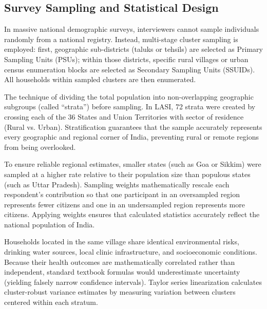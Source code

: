\documentclass[11pt,a4paper]{article}
\begin{document}
\subsection{Survey Sampling and Statistical Design}
\begin{description}[leftmargin=0.5cm, style=nextline]
    \item[\textbf{Primary Sampling Unit (PSU) and Secondary Sampling Unit (SSUID):}]
    In massive national demographic surveys, interviewers cannot sample individuals randomly from a national registry. Instead, multi-stage cluster sampling is employed: first, geographic sub-districts (taluks or tehsils) are selected as Primary Sampling Units (PSUs); within those districts, specific rural villages or urban census enumeration blocks are selected as Secondary Sampling Units (SSUIDs). All households within sampled clusters are then enumerated.

    \item[\textbf{Stratification (72 Strata):}]
    The technique of dividing the total population into non-overlapping geographic subgroups (called ``strata'') before sampling. In LASI, 72 strata were created by crossing each of the 36 States and Union Territories with sector of residence (Rural vs. Urban). Stratification guarantees that the sample accurately represents every geographic and regional corner of India, preventing rural or remote regions from being overlooked.

    \item[\textbf{Sampling Weights (\texttt{indiaindividualweight}):}]
    To ensure reliable regional estimates, smaller states (such as Goa or Sikkim) were sampled at a higher rate relative to their population size than populous states (such as Uttar Pradesh). Sampling weights mathematically rescale each respondent's contribution so that one participant in an oversampled region represents fewer citizens and one in an undersampled region represents more citizens. Applying weights ensures that calculated statistics accurately reflect the national population of India.

    \item[\textbf{Taylor Series Linearization (Cluster-Robust Standard Errors):}]
    Households located in the same village share identical environmental risks, drinking water sources, local clinic infrastructure, and socioeconomic conditions. Because their health outcomes are mathematically correlated rather than independent, standard textbook formulas would underestimate uncertainty (yielding falsely narrow confidence intervals). Taylor series linearization calculates cluster-robust variance estimates by measuring variation between clusters centered within each stratum.


\end{description}
\end{document}
